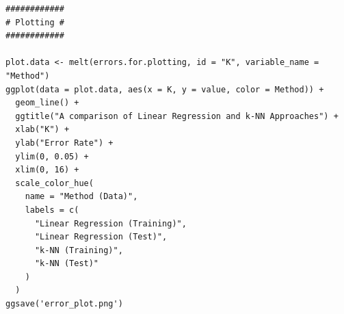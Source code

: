 \documentclass{article}
\begin{document}
\begin{verbatim}
############
# Plotting #
############

plot.data <- melt(errors.for.plotting, id = "K", variable_name = "Method")
ggplot(data = plot.data, aes(x = K, y = value, color = Method)) +
  geom_line() +
  ggtitle("A comparison of Linear Regression and k-NN Approaches") +
  xlab("K") +
  ylab("Error Rate") +
  ylim(0, 0.05) +
  xlim(0, 16) +
  scale_color_hue(
    name = "Method (Data)",
    labels = c(
      "Linear Regression (Training)",
      "Linear Regression (Test)",
      "k-NN (Training)",
      "k-NN (Test)"
    )
  )
ggsave('error_plot.png')
\end{verbatim}
\end{document}
